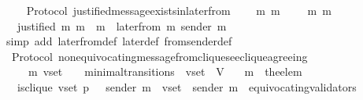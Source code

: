 \begin{isabellebody}
%
\isadelimproof
\ \ %
\endisadelimproof
%
\isatagproof
{}\isamarkupfalse%
%
\endisatagproof
{\isafoldproof}%
%
\isadelimproof
\isanewline
%
\endisadelimproof
\isanewline
\isanewline
{}\isamarkupfalse%
\ {\isacharparenleft}\ Protocol{\isacharparenright}\ justified{\isacharunderscore}message{\isacharunderscore}exists{\isacharunderscore}in{\isacharunderscore}later{\isacharunderscore}from{\isacharcolon}\isanewline
\ \ {\isachardoublequoteopen}{\isasymforall}\ {\isasymsigma}\ m{}\ m{}{\isachardot}\ {\isasymsigma}\ {\isasymin}\ {\isasymSigma}\ {\isasymand}\ {\isacharbraceleft}m{}{\isacharcomma}\ m{}{\isacharbraceright}\ {\isasymsubseteq}\ {\isasymsigma}\isanewline
\ \ {\isasymlongrightarrow}\ justified\ m{}\ m{}\ {\isasymlongrightarrow}\ m{}\ {\isasymin}\ later{\isacharunderscore}from\ {\isacharparenleft}m{}{\isacharcomma}\ sender\ m{}{\isacharcomma}\ {\isasymsigma}{\isacharparenright}{\isachardoublequoteclose}\isanewline
%
\isadelimproof
\ \ %
\endisadelimproof
%
\isatagproof
{}\isamarkupfalse%
\ {\isacharparenleft}simp\ add{\isacharcolon}\ later{\isacharunderscore}from{\isacharunderscore}def\ later{\isacharunderscore}def\ from{\isacharunderscore}sender{\isacharunderscore}def{\isacharparenright}\isanewline
\ \ \isamarkupfalse%
%
\endisatagproof
{\isafoldproof}%
%
\isadelimproof
\isanewline
%
\endisadelimproof
\isanewline
\isanewline
\isanewline
\isanewline
{}\isamarkupfalse%
\ {\isacharparenleft}\ Protocol{\isacharparenright}\ non{\isacharunderscore}equivocating{\isacharunderscore}message{\isacharunderscore}from{\isacharunderscore}clique{\isacharunderscore}see{\isacharunderscore}clique{\isacharunderscore}agreeing\ {\isacharcolon}\isanewline
\ \ {\isachardoublequoteopen}{\isasymforall}\ {\isasymsigma}\ {\isasymsigma}{\isacharprime}\ m{\isacharprime}\ v{\isacharunderscore}set{\isachardot}\ {\isacharparenleft}{\isasymsigma}{\isacharcomma}\ {\isasymsigma}{\isacharprime}{\isacharparenright}\ {\isasymin}\ minimal{\isacharunderscore}transitions\ {\isasymand}\ v{\isacharunderscore}set\ {\isasymsubseteq}\ V\isanewline
\ \ {\isasymlongrightarrow}\ m{\isacharprime}\ {\isacharequal}\ the{\isacharunderscore}elem\ {\isacharparenleft}{\isasymsigma}{\isacharprime}\ {\isacharminus}\ {\isasymsigma}{\isacharparenright}\isanewline
\ \ {\isasymlongrightarrow}\ is{\isacharunderscore}clique\ {\isacharparenleft}v{\isacharunderscore}set{\isacharcomma}\ p{\isacharcomma}\ {\isasymsigma}{\isacharparenright}\ {\isasymand}\ sender\ m{\isacharprime}\ {\isasymin}\ v{\isacharunderscore}set\ {\isasymand}\ sender\ m{\isacharprime}\ {\isasymnotin}\ equivocating{\isacharunderscore}validators\ {\isasymsigma}{\isacharprime}\ \isanewline

\end{isabellebody}
